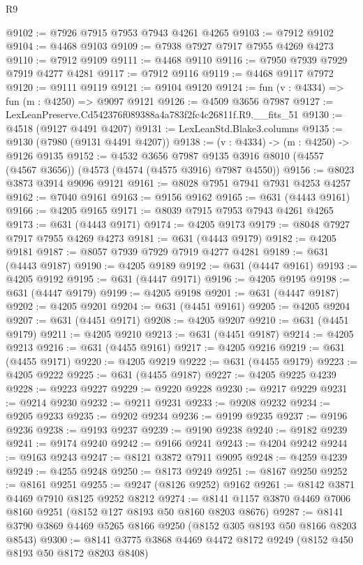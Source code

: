 \begin{lexlean}{R9}
\begin{coremodule}
@9102 := @7926 @7915 @7953 @7943 @4261 @4265
@9103 := @7912 @9102
@9104 := @4468 @9103
@9109 := @7938 @7927 @7917 @7955 @4269 @4273
@9110 := @7912 @9109
@9111 := @4468 @9110
@9116 := @7950 @7939 @7929 @7919 @4277 @4281
@9117 := @7912 @9116
@9119 := @4468 @9117 @7972
@9120 := @9111 @9119
@9121 := @9104 @9120
@9124 := fun (v : @4334) => fun (m : @4250) => @9097 @9121
@9126 := @4509 @3656 @7987
@9127 := LexLeanPreserve.Cd542376f089388a4a783f2fc4c26811f.R9.__fits_51
@9130 := @4518 (@9127 @4491 @4207)
@9131 := LexLeanStd.Blake3.columns
@9135 := @9130 (@7980 (@9131 @4491 @4207))
@9138 := (v : @4334) -> (m : @4250) -> @9126 @9135
@9152 := @4532
    @3656
    @7987
    @9135
    @3916
    @8010
    (@4557 (@4567 @3656))
    (@4573 (@4574 (@4575 @3916) @7987 @4550))
@9156 := @8023 @3873 @3914 @9096 @9121
@9161 := @8028 @7951 @7941 @7931 @4253 @4257
@9162 := @7040 @9161
@9163 := @9156 @9162
@9165 := @631 (@4443 @9161)
@9166 := @4205 @9165
@9171 := @8039 @7915 @7953 @7943 @4261 @4265
@9173 := @631 (@4443 @9171)
@9174 := @4205 @9173
@9179 := @8048 @7927 @7917 @7955 @4269 @4273
@9181 := @631 (@4443 @9179)
@9182 := @4205 @9181
@9187 := @8057 @7939 @7929 @7919 @4277 @4281
@9189 := @631 (@4443 @9187)
@9190 := @4205 @9189
@9192 := @631 (@4447 @9161)
@9193 := @4205 @9192
@9195 := @631 (@4447 @9171)
@9196 := @4205 @9195
@9198 := @631 (@4447 @9179)
@9199 := @4205 @9198
@9201 := @631 (@4447 @9187)
@9202 := @4205 @9201
@9204 := @631 (@4451 @9161)
@9205 := @4205 @9204
@9207 := @631 (@4451 @9171)
@9208 := @4205 @9207
@9210 := @631 (@4451 @9179)
@9211 := @4205 @9210
@9213 := @631 (@4451 @9187)
@9214 := @4205 @9213
@9216 := @631 (@4455 @9161)
@9217 := @4205 @9216
@9219 := @631 (@4455 @9171)
@9220 := @4205 @9219
@9222 := @631 (@4455 @9179)
@9223 := @4205 @9222
@9225 := @631 (@4455 @9187)
@9227 := @4205 @9225 @4239
@9228 := @9223 @9227
@9229 := @9220 @9228
@9230 := @9217 @9229
@9231 := @9214 @9230
@9232 := @9211 @9231
@9233 := @9208 @9232
@9234 := @9205 @9233
@9235 := @9202 @9234
@9236 := @9199 @9235
@9237 := @9196 @9236
@9238 := @9193 @9237
@9239 := @9190 @9238
@9240 := @9182 @9239
@9241 := @9174 @9240
@9242 := @9166 @9241
@9243 := @4204 @9242
@9244 := @9163 @9243
@9247 := @8121 @3872 @7911 @9095
@9248 := @4259 @4239
@9249 := @4255 @9248
@9250 := @8173 @9249
@9251 := @8167 @9250
@9252 := @8161 @9251
@9255 := @9247 (@8126 @9252) @9162
@9261 := @8142 @3871 @4469 @7910 @8125 @9252 @8212
@9274 := @8141 @1157 @3870 @4469 @7006 @8160 @9251 (@8152 @127 @8193 @50 @8160 @8203 @8676)
@9287 := @8141 @3790 @3869 @4469 @5265 @8166 @9250 (@8152 @305 @8193 @50 @8166 @8203 @8543)
@9300 := @8141 @3775 @3868 @4469 @4472 @8172 @9249 (@8152 @450 @8193 @50 @8172 @8203 @8408)

\end{coremodule}
\end{lexlean}
